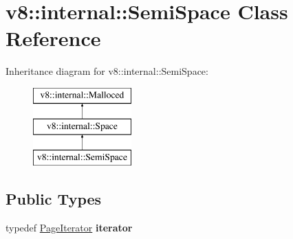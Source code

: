 \hypertarget{classv8_1_1internal_1_1SemiSpace}{}\section{v8\+:\+:internal\+:\+:Semi\+Space Class Reference}
\label{classv8_1_1internal_1_1SemiSpace}
Inheritance diagram for v8\+:\+:internal\+:\+:Semi\+Space\+:\begin{figure}[H]
\begin{center}
\leavevmode
\includegraphics[height=3.000000cm]{classv8_1_1internal_1_1SemiSpace}
\end{center}
\end{figure}
\subsection*{Public Types}
\begin{DoxyCompactItemize}
\item 
\mbox{\label{classv8_1_1internal_1_1SemiSpace_af9ffdc744bfd9e901a29bd4394327127}} 
typedef \mbox{\hyperlink{classv8_1_1internal_1_1PageIteratorImpl}{Page\+Iterator}} {\bfseries iterator}
\end{DoxyCompactItemize}

